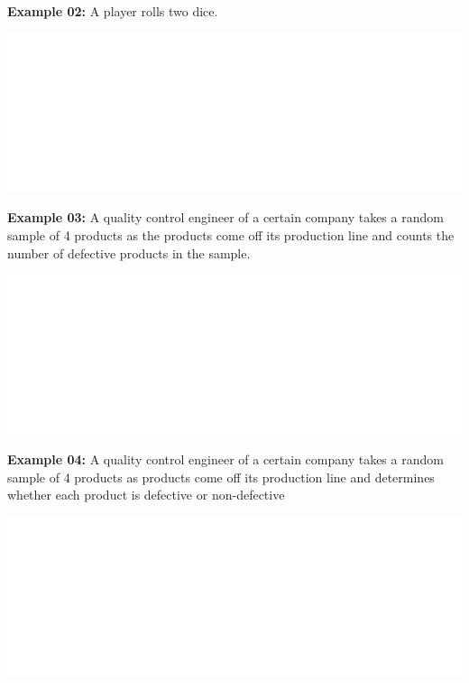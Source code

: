 \documentclass[]{book}
\begin{document}
\textbf{Example 02:} A player rolls two dice.

\begin{center}\includegraphics[width=1\linewidth]{figure/box71b-1} \end{center}

\textbf{Example 03:} A quality control engineer of a certain company takes a random sample of 4 products as the products come off its production line and counts the number of defective products in the sample.

\begin{center}\includegraphics[width=1\linewidth]{figure/box71c-1} \end{center}

\textbf{Example 04:} A quality control engineer of a certain company takes a random sample of 4 products as products come off its production line and determines whether each product is defective or non-defective

\begin{center}\includegraphics[width=1\linewidth]{figure/box71d-1} \end{center}
\end{document}
